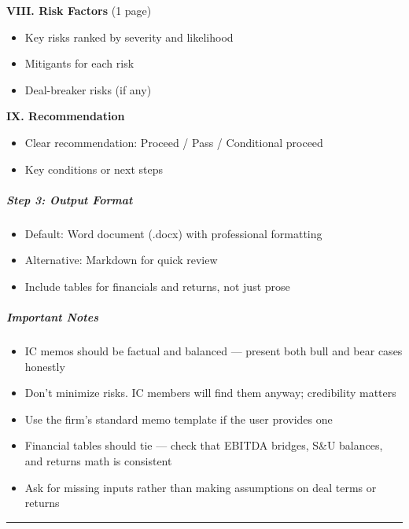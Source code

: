 \documentclass[11pt]{article}
\begin{document}
\textbf{VIII. Risk Factors} (1 page)

\begin{itemize}[leftmargin=*,itemsep=2pt,topsep=2pt]
\item {} Key risks ranked by severity and likelihood
\item {} Mitigants for each risk
\item {} Deal-breaker risks (if any)
\end{itemize}

\textbf{IX. Recommendation}

\begin{itemize}[leftmargin=*,itemsep=2pt,topsep=2pt]
\item {} Clear recommendation: Proceed / Pass / Conditional proceed
\item {} Key conditions or next steps
\end{itemize}

\subparagraph{Step 3: Output Format}\mbox{}\par

\begin{itemize}[leftmargin=*,itemsep=2pt,topsep=2pt]
\item {} Default: Word document (.docx) with professional formatting
\item {} Alternative: Markdown for quick review
\item {} Include tables for financials and returns, not just prose
\end{itemize}

\subparagraph{Important Notes}\mbox{}\par

\begin{itemize}[leftmargin=*,itemsep=2pt,topsep=2pt]
\item {} IC memos should be factual and balanced — present both bull and bear cases honestly
\item {} Don't minimize risks. IC members will find them anyway; credibility matters
\item {} Use the firm's standard memo template if the user provides one
\item {} Financial tables should tie — check that EBITDA bridges, S\&U balances, and returns math is consistent
\item {} Ask for missing inputs rather than making assumptions on deal terms or returns
\end{itemize}

\vspace{0.8em}\hrule\vspace{0.8em}
\end{document}
